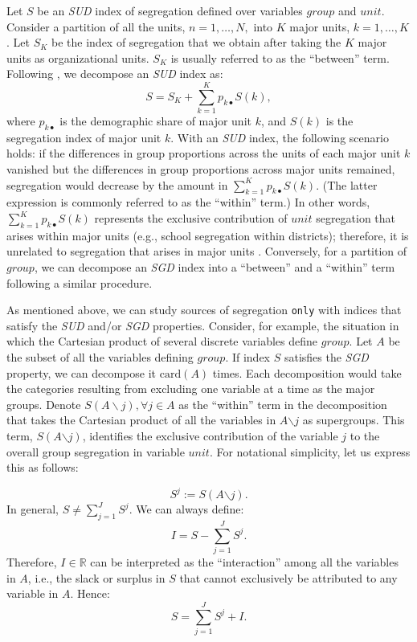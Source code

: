Let $S$ be an \textit{SUD} index of segregation defined over variables $group$ and $unit$. Consider a partition of all the units, $n=1,\ldots,N,$ into $K$ major units, $k=1,\ldots,K$. Let $S_{K}$ be the index of segregation that we obtain after taking the $K$ major units as organizational units. $S_K$ is usually referred to as the ``between'' term. Following \citet{frankel_volij_2011}, we decompose an \textit{SUD} index as:
\begin{equation}
    S = S_{K} + \sum_{k=1}^{K} p_{k \bullet} S(k),
    \label{eq: SUD-property}
\end{equation}
\noindent where $p_{k \bullet}$ is the demographic share of major unit $k$, and $S(k)$ is the segregation index of major unit $k$. With an \textit{SUD} index, the following scenario holds: if the differences in group proportions across the units of each major unit $k$ vanished but the differences in group proportions across major units remained, segregation would decrease by the amount in $\sum_{k=1}^{K} p_{k \bullet} S(k)$. (The latter expression is commonly referred to as the ``within'' term.)
In other words, $\sum_{k=1}^{K} p_{k \bullet} S(k)$ represents the exclusive contribution of $unit$ segregation that arises within major units (e.g., school segregation within districts); therefore, it is unrelated to segregation that arises in major units \citep{mora2011entropy}. Conversely, for a partition of $group$, we can decompose an \textit{SGD} index into a ``between'' and a ``within'' term following a similar procedure.

As mentioned above, we can study sources of segregation \texttt{only} with indices that satisfy the \textit{SUD} and/or \textit{SGD} properties. Consider, for example, the situation in which the Cartesian product of several discrete variables define $group$. Let $A$ be the subset of all the variables defining $group$. If index $S$ satisfies the \textit{SGD} property, we can decompose it $\text{card}(A)$ times. Each decomposition would take the categories resulting from excluding one variable at a time as the major groups. Denote $S(A\backslash j),\forall j\in A$ as the ``within'' term in the decomposition that takes the Cartesian product of all the variables in $A{\backslash j}$ as supergroups. This term, $S(A{\backslash j})$, identifies the exclusive contribution of the variable $j$ to the overall group segregation in variable $unit$. For notational simplicity, let us express this as follows:

\begin{equation}
    S^j:=S\left(A{\backslash j}\right).
    \label{eq:contribution_j}
\end{equation}
In general, $S\neq\sum_{j=1}^{J}S^j$. We can always define:
\begin{equation}
    I = S - \sum_{j=1}^{J}S^j.
    \label{eq: interaction-term-definition}
\end{equation}
Therefore, $I\in \mathbb{R}$ can be interpreted as the ``interaction'' among all the variables in $A$, i.e., the slack or surplus in $S$ that cannot exclusively be attributed to any variable in $A$. Hence:
\begin{equation}
    S =  \sum_{j=1}^{J}S^j + I.
    \label{eq: SGD-property}
\end{equation}


